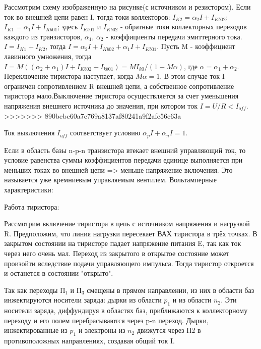 Рассмотрим схему изображенную на рисунке(с источником и резистором). Если ток во внешней цепи равен I, тогда токи коллекторов:
$I_{K2} = \alpha_2I+I_{Kb02}$; $I_{K1} = \alpha_1I+I_{Kb01}$;
здесь $I_{Kb01}$ и $I_{Kb02}$ - обратные токи коллекторных переходов каждого из транзисторов, $\alpha_1$, $\alpha_2$ - коэффициенты передачи эмиттерного тока. $I = I_{K1}+I_{K2}$, тогда  $I = \alpha_2I+I_{Kb02}+\alpha_1I+I_{Kb01}$.
Пусть M - коэффициент лавинного умножения, тогда $I = M( (\alpha_2+\alpha_1)I+I_{Kb02}+I_{kb01}) = MI_{k0}/(1-M\alpha) $, где $\alpha = \alpha_1+\alpha_2$. Переключение тиристора наступает, когда $M\alpha = 1$. В этом случае ток I ограничен сопротивлением R внешней цепи, а собственное сопротивление тиристора мало.Выключение тиристора осуществляется за счет уменьшения напряжения внешнего источника до значения, при котором ток $I=U/R < I_{off}$.
>>>>>>> 890bebc60a7e769a8137af80241a9f2afe56e63a

Ток выключения $I_{off}$ соответствует условию $\alpha_pI + \alpha_nI = 1$.

Если в область базы n-p-n транзистора втекает внешний управляющий ток, то условие равенства суммы коэффициентов передачи единице выполняется при меньших токах во внешней цепи => меньше напряжение включения. Это называется уже кремниевым управляемым вентилем. Вольтамперные характеристики:

\begin{center}
	\begin{figure}[h!]
		\caption{}	
	\end{figure}
\end{center}

Работа тиристора:
\begin{center}
	\begin{figure}[h!]
		\caption{}	
	\end{figure}
\end{center}

Рассмотрим включение тиристора в цепь с источником напряжения и нагрузкой R. Предположим, что линия нагрузки пересекает ВАХ тиристора в трёх точках. В закрытом состоянии на тиристоре падает напряжение питания E, так как ток через него очень мал. Переход из закрытого в открытое состояние может произойти вследствие подачи управляющего импульса. Тогда тиристор откроется и останется в состоянии "открыто".

Так как переходы П$_1$ и П$_3$ смещены в прямом направлении, из них в области баз инжектируются носители заряда: дырки из области $p_1$ и  из области $n_2$. Эти носители заряда, диффундируя в областях баз, приближаются к коллекторному переходу и его полем перебрасываются через p-n переход. Дырки, инжектированные из $p_1$ и электроны из $n_2$ движутся через П2 в противоположных направлениях, создавая общий ток I.

